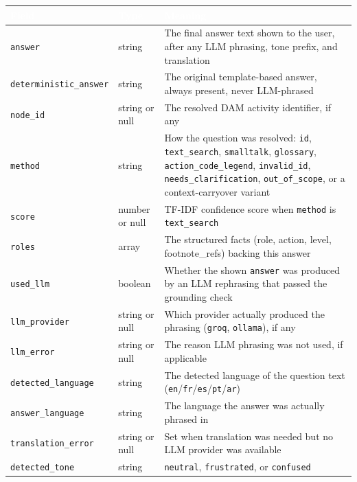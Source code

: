 \begin{longtable}{|p{}|p{}|p{}|}
\hline
\rowcolor{thesisgreen}\textcolor{white}{\textbf{Field}} & \textcolor{white}{\textbf{Type}} & \textcolor{white}{\textbf{Meaning}} \\
\hline\endhead
\texttt{answer} & string & The final answer text shown to the user, after any LLM phrasing, tone prefix, and translation \\
\hline
\texttt{deterministic\_\allowbreak{}answer} & string & The original template-based answer, always present, never LLM-phrased \\
\hline
\texttt{node\_\allowbreak{}id} & string or null & The resolved DAM activity identifier, if any \\
\hline
\texttt{method} & string & How the question was resolved: \texttt{id}, \texttt{text\_\allowbreak{}search}, \texttt{smalltalk}, \texttt{glossary}, \texttt{action\_\allowbreak{}code\_\allowbreak{}legend}, \texttt{invalid\_\allowbreak{}id}, \texttt{needs\_\allowbreak{}clarification}, \texttt{out\_\allowbreak{}of\_\allowbreak{}scope}, or a context-carryover variant \\
\hline
\texttt{score} & number or null & TF-IDF confidence score when \texttt{method} is \texttt{text\_\allowbreak{}search} \\
\hline
\texttt{roles} & array & The structured facts (role, action, level, footnote\_refs) backing this answer \\
\hline
\texttt{used\_\allowbreak{}llm} & boolean & Whether the shown \texttt{answer} was produced by an LLM rephrasing that passed the grounding check \\
\hline
\texttt{llm\_\allowbreak{}provider} & string or null & Which provider actually produced the phrasing (\texttt{groq}, \texttt{ollama}), if any \\
\hline
\texttt{llm\_\allowbreak{}error} & string or null & The reason LLM phrasing was not used, if applicable \\
\hline
\texttt{detected\_\allowbreak{}language} & string & The detected language of the question text (\texttt{en}/\texttt{fr}/\texttt{es}/\texttt{pt}/\texttt{ar}) \\
\hline
\texttt{answer\_\allowbreak{}language} & string & The language the answer was actually phrased in \\
\hline
\texttt{translation\_\allowbreak{}error} & string or null & Set when translation was needed but no LLM provider was available \\
\hline
\texttt{detected\_\allowbreak{}tone} & string & \texttt{neutral}, \texttt{frustrated}, or \texttt{confused} \\
\hline
\end{longtable}
